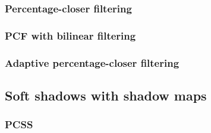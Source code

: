 \subsubsection{Percentage-closer filtering}

\subsubsection{PCF with bilinear filtering}

\subsubsection{Adaptive percentage-closer filtering}

\subsection{Soft shadows with shadow maps}

\subsubsection{PCSS}

